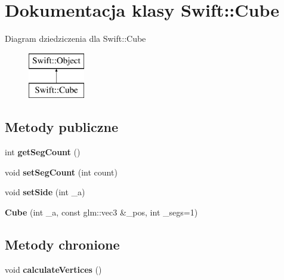 \hypertarget{class_swift_1_1_cube}{\section{Dokumentacja klasy Swift\-:\-:Cube}
\label{class_swift_1_1_cube}
}
Diagram dziedziczenia dla Swift\-:\-:Cube\begin{figure}[H]
\begin{center}
\leavevmode
\includegraphics[height=2.000000cm]{class_swift_1_1_cube}
\end{center}
\end{figure}
\subsection*{Metody publiczne}
\begin{DoxyCompactItemize}
\item 
\hypertarget{class_swift_1_1_cube_ae293fe3bde8e707a707d20e5ec586bbb}{int {\bfseries get\-Seg\-Count} ()}\label{class_swift_1_1_cube_ae293fe3bde8e707a707d20e5ec586bbb}

\item 
\hypertarget{class_swift_1_1_cube_a0837a0bfcc83b68ba5c6af78744f1170}{void {\bfseries set\-Seg\-Count} (int count)}\label{class_swift_1_1_cube_a0837a0bfcc83b68ba5c6af78744f1170}

\item 
\hypertarget{class_swift_1_1_cube_a44067639fb2828ae4f6445d9f261e2af}{void {\bfseries set\-Side} (int \-\_\-a)}\label{class_swift_1_1_cube_a44067639fb2828ae4f6445d9f261e2af}

\item 
\hypertarget{class_swift_1_1_cube_a5b1c3243362c4ec37d654d6fd9d65b87}{{\bfseries Cube} (int \-\_\-a, const glm\-::vec3 \&\-\_\-pos, int \-\_\-segs=1)}\label{class_swift_1_1_cube_a5b1c3243362c4ec37d654d6fd9d65b87}

\end{DoxyCompactItemize}
\subsection*{Metody chronione}
\begin{DoxyCompactItemize}
\item 
\hypertarget{class_swift_1_1_cube_a491f12450d538c885d9a0a5e08afac94}{void {\bfseries calculate\-Vertices} ()}\label{class_swift_1_1_cube_a491f12450d538c885d9a0a5e08afac94}

\end{DoxyCompactItemize}
